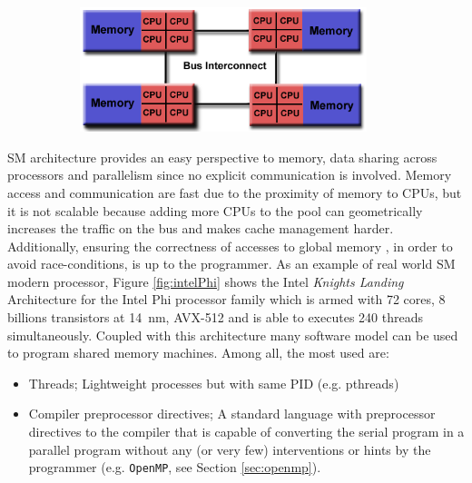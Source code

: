 \begin{description}
\begin{description}
\begin{itemize}
\begin{figure}[b]
\begin{subfigure}[b]{0.5\textwidth}
				\caption[]{}%
			\end{subfigure}%
			\begin{subfigure}[b]{0.5\textwidth}
				\centering
				\includegraphics[width=0.92\textwidth]{./images/parallel_programming/numa}
				\caption[]{}%
			\end{subfigure}%

		\end{figure}
		

	\end{itemize}
	SM architecture provides an easy perspective to memory,	data sharing across processors and parallelism since no explicit communication is involved. Memory access and communication are fast due to the proximity of memory to CPUs, but it is not scalable because adding more CPUs to the pool can geometrically increases the traffic on the bus and makes cache management harder. Additionally, ensuring the correctness of accesses to global memory , in order to avoid race-conditions, is up to the programmer.
	As an example of real world SM modern processor, Figure \ref{fig:intelPhi} shows the Intel \textit{Knights Landing} Architecture for the Intel Phi processor family which is armed with 72 cores, $8$ billions transistors at \SI{14}{\nano\metre}, AVX-512 and is able to executes 240 threads simultaneously.
	Coupled with this architecture many software model can be used to program
	shared memory machines. Among all, the most used are:
	\begin{itemize}
		\item Threads; Lightweight processes but with same PID (e.g. pthreads)
		\item Compiler preprocessor directives; A standard language with preprocessor directives to the compiler that is capable of converting the serial program in a parallel program without any (or very few) interventions or hints by the programmer (e.g. \texttt{OpenMP}, see Section \ref{sec:openmp}).		
	\end{itemize}	


\end{description}
\end{description}

